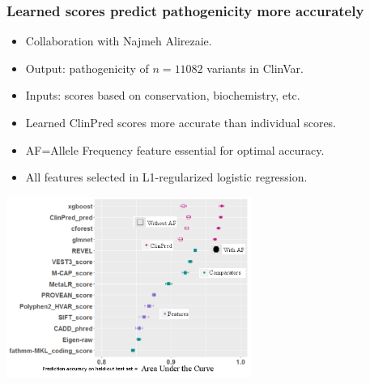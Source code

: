 \documentclass{beamer}
\begin{document}


\begin{frame}
  \frametitle{Learned scores predict pathogenicity more accurately}
  \begin{itemize}
  \item Collaboration with Najmeh Alirezaie.
  \item Output: pathogenicity of $n=11082$ variants in ClinVar.
  \item Inputs: scores based on conservation, biochemistry, etc.
  \item Learned ClinPred scores more accurate than individual scores.
  \item AF=Allele Frequency feature essential for optimal accuracy.
  \item All features selected in L1-regularized logistic regression.
  \end{itemize}
  \begin{center}
    \includegraphics[width=0.6\textwidth]{Screenshot-clinpred-auc}
  \end{center}
\end{frame}
 
\end{document}
